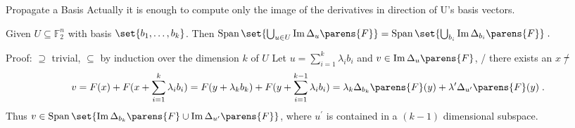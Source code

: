 \documentclass[%
    10pt,
    professionalfont,
    aspectratio=169,
    handout,
]{beamer}
\newcommand{\F}{\mathbb{F}}
\newcommand{\derive}[2]{\Delta_{#1}\parens{#2}}
\DeclareMathOperator{\ImOp}{Im}
\renewcommand{\Im}[1]{\ImOp {#1}}
\DeclareMathOperator{\SpanOp}{Span}
\newcommand{\Span}[1]{\SpanOp\set{#1}}
\begin{document}
\begin{frame}{Propagate a Basis}
    Actually it is enough to compute only the image of the derivatives in direction of U's basis vectors.
    \begin{lemma}
        Given $U \subseteq \F_2^n$ with basis $\set{b_1, \ldots, b_k}$.
        Then
        $
            \Span{\bigcup_{u \in U} \Im{\derive{u}{F}}} = \Span{\bigcup_{b_i} \Im{\derive{b_i}{F}}}\;.
        $
    \end{lemma}
    \pause
    \begin{block}{Proof: $\supseteq$ trivial, $\subseteq$ by induction over the dimension $k$ of $U$}
        Let $u = \sum_{i=1}^k \lambda_i b_i$ and $v \in \Im{\derive{u}{F}}$, \ie/ there exists an $x$ \st/
        \begin{equation*}
            v = F(x) + F(x + \sum_{i=1}^k \lambda_i b_i)
              = F(y + \lambda_k b_k) + F(y + \sum_{i=1}^{k-1} \lambda_i b_i)
              = \lambda_k \derive{b_k}{F}(y) + \lambda^\prime \derive{u^\prime}{F}(y)\;.
        \end{equation*}
        Thus $v \in \Span{\Im{\derive{b_k}{F}} \cup \Im{\derive{u^\prime}{F}}}$, where $u^\prime$ is contained in a $(k-1)$ dimensional subspace.
    \end{block}
\end{frame}
\end{document}
